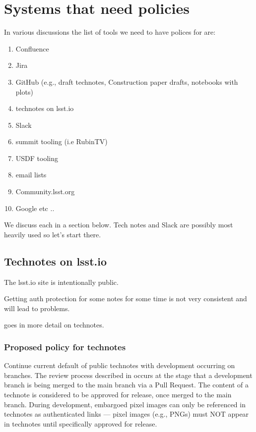 \section {Systems that need policies}
In various discussions the list of tools we need to have polices for are:

\begin{enumerate}
    \item Confluence
    \item Jira
    \item GitHub (e.g., draft technotes, Construction paper drafts, notebooks with plots)
    \item technotes on lsst.io
    \item Slack
    \item summit tooling (i.e RubinTV)
    \item USDF tooling
    \item email lists
    \item Community.lsst.org
    \item Google etc ..
\end{enumerate}

We discuss each in a section below.
Tech notes and Slack are possibly most heavily used so let's start there.



\subsection{Technotes on lsst.io}
The lsst.io site is intentionally public.

Getting auth protection for some notes for some time is not very consistent and will lead to problems.

 goes in more detail on technotes.

\subsubsection{Proposed policy for technotes}
Continue current default of public technotes with development occurring on branches. The review process described in  occurs at the stage that a development branch is being merged to the main branch via a Pull Request. The content of a technote is considered to be approved for release, once merged to the main branch.
During development, embargoed pixel images can only be referenced in technotes as authenticated links --- pixel images (e.g., PNGs) must NOT appear in technotes until specifically approved for release.


